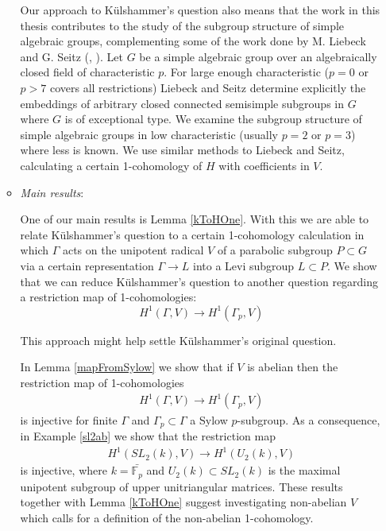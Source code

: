 \begin{itemize}
\begin{itemize}
		
		Our approach to K\"ulshammer's question also means that the work in this thesis contributes to the study of the subgroup structure of simple algebraic groups, complementing some of the work done by M. Liebeck and G. Seitz (\cite{liebeck1996reductive}, \cite{liebeck2004maximal}). Let $G$ be a simple algebraic group over an algebraically closed field of characteristic $p$. For large enough characteristic ($p=0$ or $p>7$ covers all restrictions) Liebeck and Seitz determine explicitly the embeddings of arbitrary closed connected semisimple subgroups in $G$ where $G$ is of exceptional type. We examine the subgroup structure of simple algebraic groups in low characteristic (usually $p=2$ or $p=3$) where less is known. We use similar methods to Liebeck and Seitz, calculating a certain 1-cohomology of $H$ with coefficients in $V$.
		
		

		\item \emph{Main results}:
		
		
		One of our main results is Lemma \ref{kToHOne}. With this we are able to relate K\"ulshammer's question to a certain 1-cohomology calculation in which $\Gamma$ acts on the unipotent radical $V$ of a parabolic subgroup $P \subset G$ via a certain representation $\Gamma \rightarrow L$ into a Levi subgroup $L \subset P$. We show that we can reduce K\"ulshammer's question to another question regarding a restriction map of 1-cohomologies:
		\begin{displaymath}
			H^1(\Gamma, V) \rightarrow H^1(\Gamma_p, V)
		\end{displaymath}
		
		
		This approach might help settle K\"ulshammer's original question.
		
		In Lemma \ref{mapFromSylow} we show that if $V$ is abelian then the restriction map of 1-cohomologies
		\begin{eqnarray*}
			H^1(\Gamma, V)\rightarrow H^1(\Gamma_p, V)
		\end{eqnarray*}
		is injective for finite $\Gamma$ and $\Gamma_p\subset\Gamma$ a Sylow $p$-subgroup. As a consequence, in Example \ref{sl2ab} we show that the restriction map
		\begin{eqnarray*}
			H^1(SL_2(k), V) \rightarrow H^1(U_2(k), V)
		\end{eqnarray*}
		is injective, where $k = \bar{\mathbb{F}_p}$ and $U_2(k)\subset SL_2(k)$ is the maximal unipotent subgroup of upper unitriangular matrices. These results together with Lemma \ref{kToHOne} suggest investigating non-abelian $V$ which calls for a definition of the non-abelian 1-cohomology.


\end{itemize}
\end{itemize}
